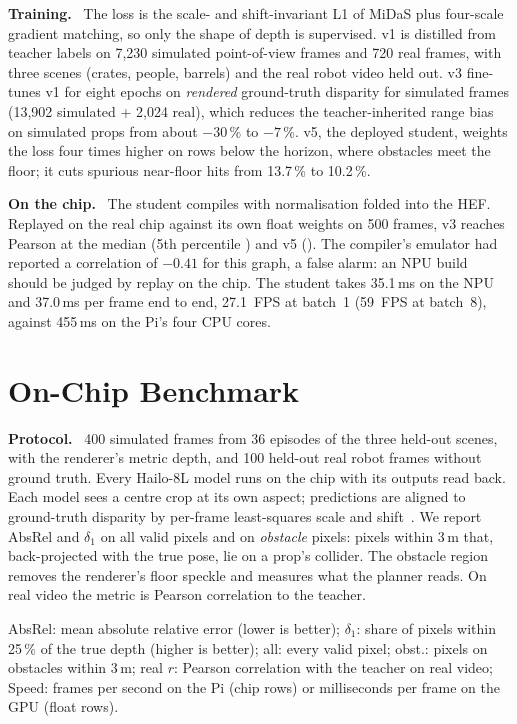 \documentclass[conference]{IEEEtran}
\newcommand{\hailo}{Hailo-8L}
\newcommand{\dav}{Depth Anything~V2}
\newcommand{\keyline}[1]{\smallskip\noindent\textbf{#1}\ }
\begin{document}
\keyline{Training.} The loss is the scale- and shift-invariant L1 of MiDaS plus four-scale gradient matching, so only the
shape of depth is supervised. v1 is distilled from teacher labels on 7{,}230 simulated point-of-view frames and 720 real
frames, with three scenes (crates, people, barrels) and the real robot video held out. v3 fine-tunes v1 for eight epochs on
\emph{rendered} ground-truth disparity for simulated frames (13{,}902 simulated + 2{,}024 real), which reduces the
teacher-inherited range bias on simulated props from about $-30$\,\% to $-7$\,\%. v5, the deployed student, weights the loss
four times higher on rows below the horizon, where obstacles meet the floor; it cuts spurious near-floor hits from 13.7\,\% to
10.2\,\%.

\keyline{On the chip.} The student compiles with normalisation folded into the HEF. Replayed on the real chip against its
own float weights on 500 frames, v3 reaches Pearson \chipfidpfifty{} at the median (5th percentile \chipfidpfive) and v5
\chipfidvfivepfifty{} (\chipfidvfivepfive). The compiler's emulator had reported a correlation of $-0.41$ for this graph, a false
alarm: an NPU build should be judged by replay on the chip. The student takes 35.1\,ms on the NPU and 37.0\,ms per frame end to
end, 27.1~FPS at batch~1 (59~FPS at batch~8), against 455\,ms on the Pi's four CPU cores.

\section{On-Chip Benchmark}\label{sec:bench}
\keyline{Protocol.} 400 simulated frames from 36 episodes of the three held-out scenes, with the renderer's metric depth,
and 100 held-out real robot frames without ground truth. Every \hailo{} model runs on the chip with its outputs read back.
Each model sees a centre crop at its own aspect; predictions are aligned to ground-truth disparity by per-frame least-squares
scale and shift~\cite{ranftl2022midas}. We report AbsRel and $\delta_1$ on all valid pixels and on \emph{obstacle} pixels:
pixels within 3\,m that, back-projected with the true pose, lie on a prop's collider. The obstacle region removes the
renderer's floor speckle and measures what the planner reads. On real video the metric is Pearson correlation to the teacher.

\begin{table}[t]
\centering\footnotesize
\setlength{\tabcolsep}{4pt}
\caption{Depth on held-out frames (400 sim frames with metric GT; $r$: median Pearson to \dav-Large on 100 real frames).
Bold: best on the chip.}
\label{tab:bench}

\vspace{1mm}\par\raggedright\footnotesize
AbsRel: mean absolute relative error (lower is better); $\delta_1$: share of pixels within 25\,\% of the true depth (higher
is better); all: every valid pixel; obst.: pixels on obstacles within 3\,m; real $r$: Pearson correlation with the teacher on
real video; Speed: frames per second on the Pi (chip rows) or milliseconds per frame on the GPU (float rows).
\end{table}
\end{document}
